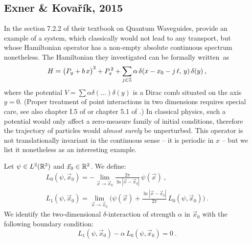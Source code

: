 
\subsection{Exner \& Kovařík, 2015}
In the section 7.2.2 of their textbook on Quantum Waveguides, \cite{ExnerKovarik2015} provide an example of a system, which classically would not lead to any transport, but whose Hamiltonian operator has a non-empty absolute continuous spectrum nonetheless. The Hamiltonian they investigated can be formally written~as
\begin{equation*}
    H
    = \big(P_y + b \, x \big)^2
    + P_x^{\,2}
    + \sum_{j\in\mathbb{Z}} \alpha \, \delta(x - x_0 - j \, \ell, \, y) \, \delta(y)
    \: ,
\end{equation*}
where the potential $V = \sum\alpha\delta(...)\delta(y)$ is a Dirac comb situated on the axis $y=0$. (Proper treatment of point interactions in two dimensions requires special care, see also chapter I.5 of \cite{Albeverio2005} or chapter 5.1 of \cite{ExnerKovarik2015}.) In classical physics, such a potential would only affect a zero-measure family of initial conditions, therefore the trajectory of particles would \textit{almost surely} be unperturbed. This operator is not translationally invariant in the continuous sense – it is periodic in $x$ – but we list it nonetheless as an interesting example.
\begin{defn}
    Let $\psi \in L^2(\mathbb{R}^2)$ and $\vec x_0 \in \mathbb{R}^2$. We define:
    \begin{gather*}
        L_0(\psi, \vec x_0)
        = - \lim_{\vec x \to \vec x_0}
        \frac{2\pi}{\ln| \vec x - \vec x_0 |} \,
        \psi(\vec x)
        \: ,
        \\[7pt]
        L_1(\psi, \vec x_0)
        = \lim_{\vec x \to \vec x_0}
        \Big(
            \psi(\vec x) +
            \frac{\ln| \vec x - \vec x_0 |}{2\pi} \,
            L_0(\psi, \vec x_0)
        \Big)
        \: .
    \end{gather*}
    We identify the two-dimensional $\delta$-interaction of strength $\alpha$ in $\vec x_0$ with the following boundary condition:
    \begin{equation*}
        L_1(\psi, \vec x_0) - \alpha \, L_0(\psi, \vec x_0) = 0
        \: .
    \end{equation*}
\end{defn}
